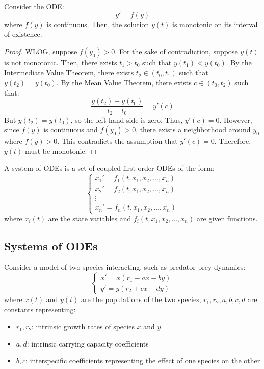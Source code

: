 \documentclass[11pt]{article}
\begin{document}
\begin{theorem}
    Consider the ODE:
    $$
    y' = f(y)
    $$
    where \( f(y) \) is continuous. Then, the solution \( y(t) \) is monotonic on its interval of existence.
    
\end{theorem}
\begin{proof}
    WLOG, suppose \( f(y_0) > 0 \). For the sake of contradiction, suppose \( y(t) \) is not monotonic. Then, there exists \( t_1 > t_0 \) such that \( y(t_1) < y(t_0) \). By the Intermediate Value Theorem, there exists \( t_2 \in (t_0, t_1) \) such that \( y(t_2) = y(t_0) \). By the Mean Value Theorem, there exists \( c \in (t_0, t_2) \) such that:
    $$\frac{y(t_2) - y(t_0)}{t_2 - t_0} = y'(c)$$
    But \( y(t_2) = y(t_0) \), so the left-hand side is zero. Thus, \( y'(c) = 0 \). However, since \( f(y) \) is continuous and \( f(y_0) > 0 \), there exists a neighborhood around \( y_0 \) where \( f(y) > 0 \). This contradicts the assumption that \( y'(c) = 0 \). Therefore, \( y(t) \) must be monotonic.
\end{proof}

\begin{definition}
    A system of ODEs is a set of coupled first-order ODEs of the form:
    $$
    \begin{cases}
    x_1' = f_1(t, x_1, x_2, \ldots, x_n) \\
    x_2' = f_2(t, x_1, x_2, \ldots, x_n) \\
    \vdots \\
    x_n' = f_n(t, x_1, x_2, \ldots, x_n)
    \end{cases}
    $$
    where \( x_i(t) \) are the state variables and \( f_i(t, x_1, x_2, \ldots, x_n) \) are given functions.
\end{definition}
\subsection{Systems of ODEs}

\begin{definition}
    Consider a model of two species interacting, such as predator-prey dynamics:
    $$
    \begin{cases}
    x' = x(r_1 - ax -by) \\
    y' = y(r_2 + cx - dy)
    \end{cases}
    $$
    where \( x(t) \) and \( y(t) \) are the populations of the two species, \( r_1, r_2, a, b, c, d \) are constants representing:
    \begin{itemize}
        \item \( r_1, r_2 \): intrinsic growth rates of species \( x \) and \( y \)
        \item \( a, d \): intrinsic carrying capacity coefficients
        \item \( b, c \): interspecific coefficients representing the effect of one species on the other
    \end{itemize}
\end{definition}
\end{document}
